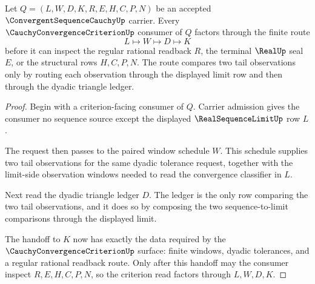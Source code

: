 \begin{theorem}\label{thm:convergent-sequence-cauchy-window-factorization}
Let $Q=(L,W,D,K,R,E,H,C,P,N)$ be an accepted $\ConvergentSequenceCauchyUp$ carrier. Every $\CauchyConvergenceCriterionUp$ consumer of $Q$ factors through the finite route
$$
L \longmapsto W \longmapsto D \longmapsto K
$$
before it can inspect the regular rational readback $R$, the terminal $\RealUp$ seal $E$, or the structural rows $H,C,P,N$. The route compares two tail observations only by routing each observation through the displayed limit row and then through the dyadic triangle ledger.
\end{theorem}
\begin{proof}
Begin with a criterion-facing consumer of $Q$. Carrier admission gives the consumer no sequence source except the displayed $\RealSequenceLimitUp$ row $L$.

The request then passes to the paired window schedule $W$. This schedule supplies two tail observations for the same dyadic tolerance request, together with the limit-side observation windows needed to read the convergence classifier in $L$.

Next read the dyadic triangle ledger $D$. The ledger is the only row comparing the two tail observations, and it does so by composing the two sequence-to-limit comparisons through the displayed limit.

The handoff to $K$ now has exactly the data required by the $\CauchyConvergenceCriterionUp$ surface: finite windows, dyadic tolerances, and a regular rational readback route. Only after this handoff may the consumer inspect $R,E,H,C,P,N$, so the criterion read factors through $L,W,D,K$.
\end{proof}

